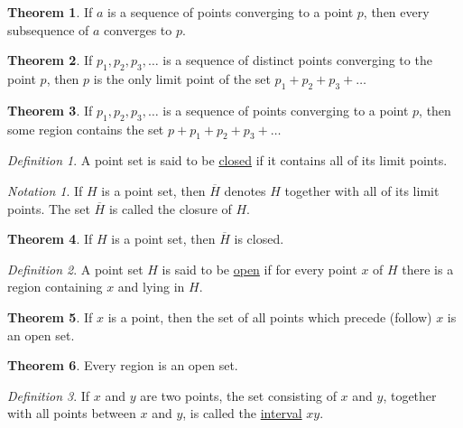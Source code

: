 \documentclass[12pt, oneside, letter] {amsart}
\theoremstyle {definition}
\newtheorem {thm} {Theorem}
\theoremstyle {remark}
\newtheorem* {defn} {Definition}
\newtheorem* {note} {Notation}
\begin{document}
\begin{thm}
  If $a$ is a sequence of points converging to a point $p$, then every
  subsequence of $a$ converges to $p$.
\end{thm}

\begin{thm}
  If $p_1, p_2, p_3, \dots$ is a sequence of distinct points
  converging to the point $p$, then $p$ is the only limit point of the
  set \linebreak \mbox {$p_1 + p_2 + p_3 + \dots$}
\end{thm}

\begin{thm}
  If $p_1, p_2, p_3, \dots$ is a sequence of points converging to a
  point $p$, then some region contains the set $p + p_1 + p_2 + p_3 +
  \dots$
\end{thm}

\begin{defn}
  A point set is said to be \underline {closed} if it contains all of
  its limit points.
\end{defn}

\begin{note}
  If $H$ is a point set, then $\overline H$ denotes $H$ together with
  all of its limit points. The set $\overline H$ is called the closure
  of $H$.
\end{note}

\begin{thm}
  If $H$ is a point set, then $\overline H$ is closed.
\end{thm}

\begin{defn}
  A point set $H$ is said to be \underline {open} if for every point
  $x$ of $H$ there is a region containing $x$ and lying in $H$.
\end{defn}

\begin{thm}
  If $x$ is a point, then the set of all points which precede (follow)
  $x$ is an open set.
\end{thm}

\begin{thm}
  Every region is an open set.
\end{thm}

\begin{defn}
  If $x$ and $y$ are two points, the set consisting of $x$ and $y$,
  together with all points between $x$ and $y$, is called the
  \underline {interval} $xy$.
\end{defn}
\end{document}
